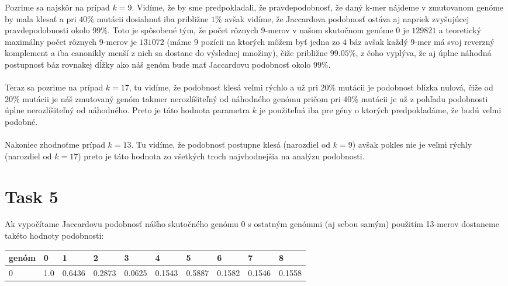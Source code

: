 \documentclass[a4paper]{article}
\begin{document}
Pozrime sa najskôr na prípad $k=9$. Vidíme, že by sme predpokladali, že pravdepodobnosť, že daný k-mer nájdeme v zmutovanom genóme by mala klesať a pri $40\%$ mutácii dosiahnuť iba približne $1\%$ avšak vidíme, že Jaccardova podobnosť ostáva aj napriek zvyšujúcej pravdepodobnosti okolo $99\%$. Toto je spôsobené tým, že počet rôznych 9-merov v našom skutočnom genóme 0 je $129821$ a teoretický maximálny počet rôznych 9-merov je $131072$ (máme $9$ pozícii na ktorých môžem byť jedna zo $4$ báz avšak každý 9-mer má svoj reverzný komplement a iba canonikly menší z nich sa dostane do výslednej množiny), čiže približne $99.05\%$, z čoho vyplýva, že aj úplne náhodná postupnosť báz rovnakej dĺžky ako náš genóm bude mať Jaccardovu podobnosť okolo $99\%$.
\\
\\
Teraz sa pozrime na prípad $k=17$, tu vidíme, že podobnosť klesá veľmi rýchlo a už pri $20\%$ mutácii je podobnosť blízka nulová, čiže od $20\%$ mutácii je náš zmutovaný genóm takmer nerozlíšiteľný od náhodného genómu pričom pri $40\%$ mutácii je už z pohľadu podobnosti úplne nerozlíšiteľný od náhodného. Preto je táto hodnota parametra $k$ je použiteľná iba pre gény o ktorých predpokladáme, že budú veľmi podobné.
\\
\\
Nakoniec zhodnoťme prípad $k=13$. Tu vidíme, že podobnosť postupne klesá (narozdiel od $k=9$) avšak pokles nie je veľmi rýchly (narozdiel od $k=17$) preto je táto hodnota zo všetkých troch najvhodnejšia na analýzu podobnosti.

\section{Task 5}

Ak vypočítame Jaccardovu podobnosť nášho skutočného genómu 0 s ostatným genómmi (aj sebou samým) použitím 13-merov dostaneme takéto hodnoty podobnosti: 
 
\begin{table}[!h]
	\begin{tabular}{|l|l|l|l|l|l|l|l|l|l|}
		\hline
		genóm  & 0 & 1 & 2 & 3 & 4 & 5 & 6 & 7 & 8  \\ \hline
		0 & 1.0 &
		0.6436 &
		0.2873 &
		0.0625 &
		0.1543 &
		0.5887 &
		0.1582 &
		0.1546 &
		0.1558 \\ \hline
		
	\end{tabular}
\end{table}
\end{document}
